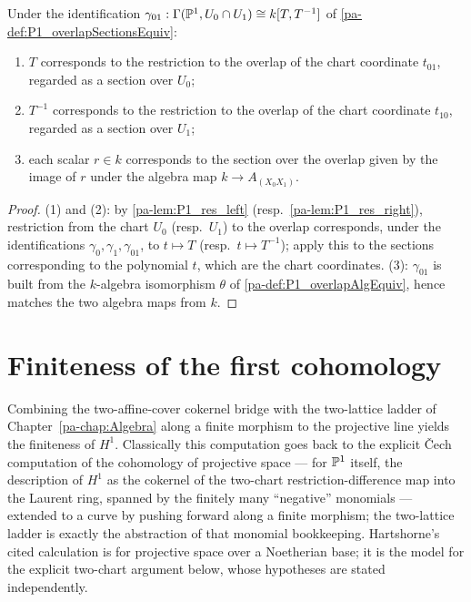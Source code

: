 \begin{lemma}
  \label{pa-lem:P1_laurent_generators}
  \leanok

  Under the identification
  \(\gamma_{01} : \Gamma(\mathbb{P}^1, U_0 \cap U_1) \cong k[T, T^{-1}]\) of
  \ref{pa-def:P1_overlapSectionsEquiv}:
  \begin{enumerate}
    \item \(T\) corresponds to the restriction to the overlap of the chart coordinate
      \(t_{01}\), regarded as a section over \(U_0\);
    \item \(T^{-1}\) corresponds to the restriction to the overlap of the chart
      coordinate \(t_{10}\), regarded as a section over \(U_1\);
    \item each scalar \(r \in k\) corresponds to the section over the overlap given by
      the image of \(r\) under the algebra map \(k \to A_{(X_0X_1)}\).
  \end{enumerate}
\end{lemma}
\begin{proof}
  \leanok
  (1) and (2): by \ref{pa-lem:P1_res_left} (resp.\ \ref{pa-lem:P1_res_right}), restriction from
  the chart \(U_0\) (resp.\ \(U_1\)) to the overlap corresponds, under the
  identifications \(\gamma_0, \gamma_1, \gamma_{01}\), to \(t \mapsto T\) (resp.\
  \(t \mapsto T^{-1}\)); apply this to the sections corresponding to the polynomial
  \(t\), which are the chart coordinates. (3): \(\gamma_{01}\) is built from the
  \(k\)-algebra isomorphism \(\theta\) of \ref{pa-def:P1_overlapAlgEquiv}, hence matches the
  two algebra maps from \(k\).
\end{proof}

\section{Finiteness of the first cohomology}

Combining the two-affine-cover cokernel bridge with the two-lattice ladder of
Chapter~\ref{pa-chap:Algebra} along a finite morphism to the projective line yields the
finiteness of \(H^1\). Classically this computation goes back to the explicit \v{C}ech
computation of the cohomology of projective space --- for \(\mathbb{P}^1\) itself, the
description of \(H^1\) as the cokernel of the two-chart restriction-difference map into
the Laurent ring, spanned by the finitely many ``negative'' monomials --- extended to a
curve by pushing forward along a finite morphism; the two-lattice ladder is exactly the
abstraction of that monomial bookkeeping.
Hartshorne's cited calculation is for projective space over a Noetherian base; it is the
model for the explicit two-chart argument below, whose hypotheses are stated independently.


